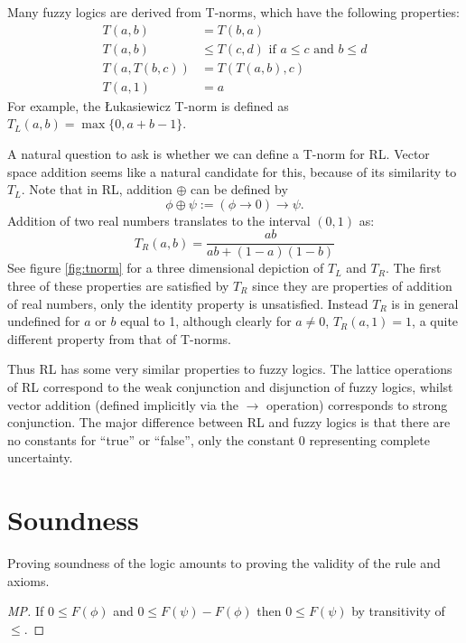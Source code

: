 \documentclass[preprint,leqno]{elsarticle}
\begin{document}
Many fuzzy logics are derived from T-norms, which have the following
properties:
\begin{align}
\tag{Commutativity} T(a, b) &= T(b, a) \\
\tag{Monotonicity} T(a, b) &\le T(c, d) \text{ if } a \le c  \text{ and } b \le d\\
\tag{Associativity} T(a, T(b, c)) &= T(T(a, b), c)\\
\tag{Identity} T(a, 1) &= a
\end{align}
For example, the \L ukasiewicz T-norm is defined as $T_L(a,b) =
\max\{0,a + b - 1\}$.

A natural question to ask is whether we can define a T-norm for
RL. Vector space addition seems like a natural candidate for this,
because of its similarity to $T_L$. Note that in RL, addition $\oplus$
can be defined by
$$\phi \oplus \psi := (\phi \rightarrow 0) \rightarrow \psi.$$
Addition of two real numbers translates to the interval $(0,1)$ as:
$$T_R(a, b) = \frac{ab}{ab + (1-a)(1-b)}$$
See figure \ref{fig:tnorm} for a three dimensional depiction of $T_L$
and $T_R$. The first three of these properties are satisfied by $T_R$
since they are properties of addition of real numbers, only the
identity property is unsatisfied. Instead $T_R$ is in general
undefined for $a$ or $b$ equal to 1, although clearly for $a \neq 0$,
$T_R(a,1) = 1$, a quite different property from that of T-norms.

Thus RL has some very similar properties to fuzzy logics. The lattice
operations of RL correspond to the weak conjunction and disjunction of
fuzzy logics, whilst vector addition (defined implicitly via the
$\rightarrow$ operation) corresponds to strong conjunction. The major
difference between RL and fuzzy logics is that there are no constants
for ``true'' or ``false'', only the constant 0 representing complete
uncertainty.

\section{Soundness}

Proving soundness of the logic amounts to proving the validity of the
rule and axioms.


\begin{proof}[MP]
If $0 \le F(\phi)$ and $0 \le F(\psi) - F(\phi)$ then
$0 \le F(\psi)$ by transitivity of $\le$.
\end{proof}
\end{document}
